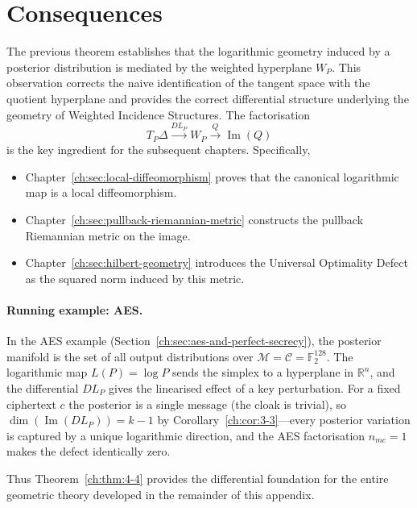 \section{Consequences}\label{ch:sec:consequences-projection}
The previous theorem establishes that the logarithmic geometry induced by a posterior distribution is mediated by the weighted hyperplane
$W_P.$
This observation corrects the naive identification of the tangent space with the quotient hyperplane and provides the correct differential structure underlying the geometry of Weighted Incidence Structures.
The factorisation
\[
T_P\Delta
\xrightarrow{DL_P}
W_P
\xrightarrow{Q}
\operatorname{Im}(Q)
\]
is the key ingredient for the subsequent chapters.
Specifically,
\begin{itemize}
\item Chapter~\ref{ch:sec:local-diffeomorphism} proves that the canonical logarithmic map is a local diffeomorphism.
\item Chapter~\ref{ch:sec:pullback-riemannian-metric} constructs the pullback Riemannian metric on the image.
\item Chapter~\ref{ch:sec:hilbert-geometry} introduces the Universal Optimality Defect as the squared norm induced by this metric.
\end{itemize}
\paragraph{Running example: AES.}
In the AES example (Section~\ref{ch:sec:aes-and-perfect-secrecy}), the posterior manifold is the set of all output distributions over $\mathcal M=\mathcal C=\mathbb F_2^{128}$.  The logarithmic map $L(P)=\log P$ sends the simplex to a hyperplane in $\mathbb R^n$, and the differential $DL_P$ gives the linearised effect of a key perturbation.  For a fixed ciphertext $c$ the posterior is a single message (the cloak is trivial), so $\dim(\operatorname{Im}(DL_P))=k-1$ by Corollary~\ref{ch:cor:3-3}---every posterior variation is captured by a unique logarithmic direction, and the AES factorisation $n_{mc}=1$ makes the defect identically zero.

Thus Theorem~\ref{ch:thm:4-4} provides the differential foundation for the entire geometric theory developed in the remainder of this appendix.
